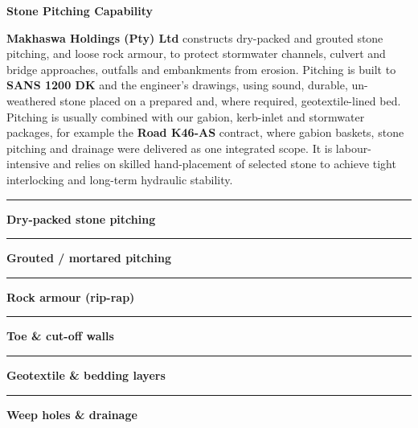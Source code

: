 \hypertarget{sec:pitching}{}

\noindent
\begin{minipage}[t]{0.62\textwidth}
    \vspace{0pt}
    {\large\bfseries\color{mhnavy} Stone Pitching Capability}
    \vspace{0.08cm}

    {\fontsize{8.5pt}{11.8pt}\selectfont\color{mhtext}
    \textbf{Makhaswa Holdings (Pty) Ltd} constructs dry-packed and grouted stone pitching, and loose rock armour, to protect stormwater channels, culvert and bridge approaches, outfalls and embankments from erosion. Pitching is built to \textbf{SANS 1200 DK} and the engineer's drawings, using sound, durable, un-weathered stone placed on a prepared and, where required, geotextile-lined bed.\\[3pt]
    Pitching is usually combined with our gabion, kerb-inlet and stormwater packages, for example the \textbf{Road K46-AS} contract, where gabion baskets, stone pitching and drainage were delivered as one integrated scope. It is labour-intensive and relies on skilled hand-placement of selected stone to achieve tight interlocking and long-term hydraulic stability.
    }
\end{minipage}
\hfill
\begin{minipage}[t]{0.34\textwidth}
    \vspace{0pt}
    \begin{tcolorbox}[
        enhanced, colback=mhoffwhite, colframe=mhnavy, boxrule=0.8pt, arc=4pt,
        title={\bfseries\color{white}\faMountain\ Pitching Scope of Work},
        colbacktitle=mhnavy, left=7pt, right=7pt, top=5pt, bottom=5pt,
        drop shadow=black!4
    ]
        \fontsize{7.8pt}{11.0pt}\selectfont
        \textcolor{mhnavy}{\rule{3.5pt}{3.5pt}}\hspace{4pt}\textbf{Dry-packed stone pitching}\\
        \textcolor{mhnavy}{\rule{3.5pt}{3.5pt}}\hspace{4pt}\textbf{Grouted / mortared pitching}\\
        \textcolor{mhnavy}{\rule{3.5pt}{3.5pt}}\hspace{4pt}\textbf{Rock armour (rip-rap)}\\
        \textcolor{mhnavy}{\rule{3.5pt}{3.5pt}}\hspace{4pt}\textbf{Toe \& cut-off walls}\\
        \textcolor{mhnavy}{\rule{3.5pt}{3.5pt}}\hspace{4pt}\textbf{Geotextile \& bedding layers}\\
        \textcolor{mhnavy}{\rule{3.5pt}{3.5pt}}\hspace{4pt}\textbf{Weep holes \& drainage}
    \end{tcolorbox}
\end{minipage}

